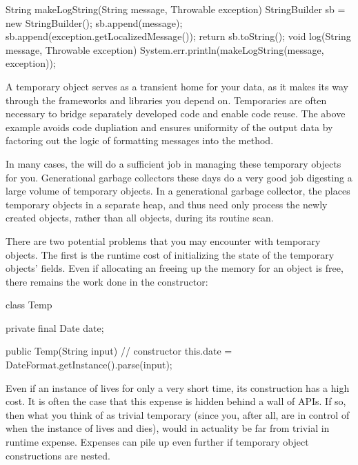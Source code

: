 \begin{shortlisting}
String makeLogString(String message, Throwable exception) {
	StringBuilder sb = new StringBuilder();
	sb.append(message);
	sb.append(exception.getLocalizedMessage());
	return sb.toString();
}
void log(String message, Throwable exception) {
	System.err.println(makeLogString(message, exception));
}
\end{shortlisting}

A temporary object serves as a transient home for your data, as it makes its way
through the frameworks and libraries you depend on. Temporaries are often
necessary to bridge separately developed code and enable code reuse. The above
example avoids code dupliation and ensures uniformity of the output data by
factoring out the logic of formatting messages into the 
method.


In many cases, the \jre will do a sufficient job in managing these temporary
objects for you. Generational garbage collectors  these days do a very good job digesting a large volume of temporary
objects. In a generational garbage collector, the \jre places temporary objects
in a separate heap, and thus need only process the newly created objects, rather
than all objects, during its routine scan.

There are two potential problems that you may encounter with temporary objects.
The first is the runtime cost of initializing the state of the temporary
objects' fields. Even if allocating an freeing up the memory for an object is
free, there remains the work done in the constructor:

\begin{shortlisting}
class Temp {
	private final Date date;
	
	public Temp(String input) { // constructor
		this.date = DateFormat.getInstance().parse(input);
	}
}
\end{shortlisting}

Even if an instance of  lives for only a very short time, its
construction has a high cost. It is often the case that this expense is hidden
behind a wall of APIs. If so, then what you think of as trivial temporary (since
you, after all, are in control of when the instance of  lives and
dies), would in actuality be far from trivial in runtime expense. Expenses can
pile up even further if temporary object constructions are nested.

